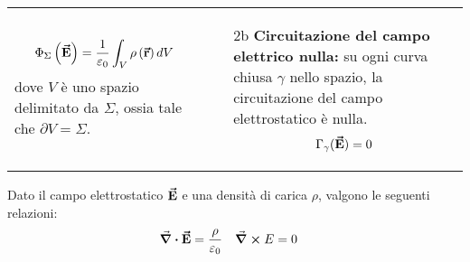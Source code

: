 \begin{remember}
\begin{tabular}{p{}p{}}
\begin{itemize}
				\begin{equation*}
					\Phi_\Sigma\left(\vb*{\va{E}}\right)=\frac{1}{\varepsilon_0}\int_{V}\rho\left(\vb*{\va{r}}\right)dV
				\end{equation*}
				dove $V$ è uno spazio delimitato da $\Sigma$, ossia tale che $\partial V=\Sigma$.
			\end{itemize} &
			\begin{itemize}
				\item[2b] \textbf{Circuitazione del campo elettrico nulla:} su ogni curva chiusa $\gamma$ nello spazio, la circuitazione del campo elettrostatico è nulla.
				\begin{equation*}
					\Gamma_{\gamma}(\vb*{\va{E}})=0
				\end{equation*}
			\end{itemize}
		\end{tabular}
\end{remember}
\begin{theorema}
	Dato il campo elettrostatico $\vb*{\va{E}}$ e una densità di carica $\rho$, valgono le seguenti relazioni:
		\begin{align}
			\div{\vb*{\va{E}}}&= \frac{\rho}{\varepsilon_0} &
			\curl{E}&= 0
		\end{align}
\end{theorema}
